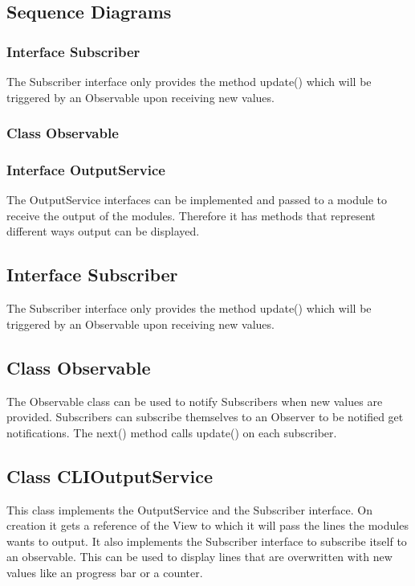 \documentclass[parskip=full]{scrartcl}
\begin{document}
\subsection{Sequence Diagrams}


 \subsubsection{Interface Subscriber}
The Subscriber interface only provides the method update() which will be triggered by an Observable upon receiving new values.

\subsubsection{Class Observable} 

\subsubsection{Interface OutputService}
The OutputService interfaces can be implemented and passed to a module to receive the output of the modules. 
Therefore it has methods that represent different ways output can be displayed. 

 \subsection{Interface Subscriber}
The Subscriber interface only provides the method update() which will be triggered by an Observable upon receiving new values.

\subsection{Class Observable} 

The Observable class can be used to notify Subscribers when new values are provided.
Subscribers can subscribe themselves to an Observer to be notified get notifications.
The next() method calls update() on each subscriber.


\subsection{Class CLIOutputService}
This class implements the OutputService and the Subscriber interface. 
On creation it gets a reference of the View to which it will pass the lines the modules wants to output.
It also implements the Subscriber interface to subscribe itself to an observable.
This can be used to display lines that are overwritten with new values like an progress bar or a counter.
\end{document}
